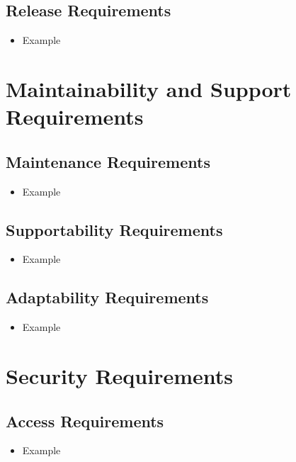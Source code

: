 \documentclass[12pt]{article}
\begin{document}
  \subsection{Release Requirements}
    \begin{itemize}
      \item Example
    \end{itemize}

\section{Maintainability and Support Requirements}
  \subsection{Maintenance Requirements}
    \begin{itemize}
      \item Example
    \end{itemize}

  \subsection{Supportability Requirements}
    \begin{itemize}
      \item Example
    \end{itemize}

  \subsection{Adaptability Requirements}
    \begin{itemize}
      \item Example
    \end{itemize}

\section{Security Requirements}
  \subsection{Access Requirements}
    \begin{itemize}
      \item Example
    \end{itemize}
\end{document}
